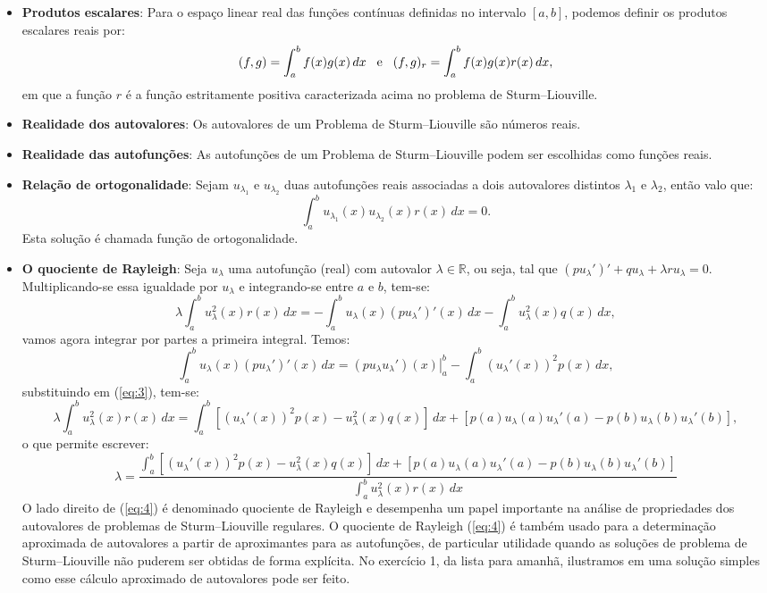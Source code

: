 \documentclass[10pt,a4paper]{article}
\begin{document}
	\begin{itemize}
		\item \textbf{Produtos escalares}: Para o espaço linear real das funções contínuas definidas no intervalo $[a,b]$, podemos definir os produtos escalares reais por: \[(f,g) = \int_a^b f(x)g(x)\,dx \hspace{.3cm}\text{e}\hspace{.3cm}(f,g)_r = \int_a^bf(x)g(x)r(x)\,dx,\] em que a função $r$ é a função estritamente positiva caracterizada acima no problema de Sturm--Liouville.
		\item \textbf{Realidade dos autovalores}: Os autovalores de um Problema de Sturm--Liouville são números reais.
		\item \textbf{Realidade das autofunções}: As autofunções de um Problema de Sturm--Liouville podem ser escolhidas como funções reais.
		\item \textbf{Relação de ortogonalidade}: Sejam $u_{\lambda_1}$ e $u_{\lambda_2}$ duas autofunções reais associadas a dois autovalores distintos $\lambda_1$ e $\lambda_2$, então valo que: \[\int_a^b u_{\lambda_1}(x)u_{\lambda_2}(x)r(x)\,dx = 0.\] Esta solução é chamada função de ortogonalidade.
		\item \textbf{O quociente de Rayleigh}: Seja $u_\lambda$ uma autofunção (real) com autovalor $\lambda\in\mathbb{R}$, ou seja, tal que $(pu_\lambda')'+qu_\lambda+\lambda ru_\lambda = 0$. Multiplicando-se essa igualdade por $u_\lambda$ e integrando-se entre $a$ e $b$, tem-se:
		\begin{equation}
			\lambda\int_a^b u_\lambda^2(x)r(x)\,dx = -\int_a^bu_\lambda(x)(pu_\lambda')'(x)\,dx - \int_a^bu_\lambda^2(x)q(x)\,dx,
			\label{eq:3}
		\end{equation}
		vamos agora integrar por partes a primeira integral. Temos: \[\int_a^bu_\lambda(x)(pu_\lambda')'(x)\,dx = \left. (pu_\lambda u_\lambda')(x) \right|_a^b - \int_a^b(u_\lambda'(x))^2p(x)\,dx,\] substituindo em (\ref{eq:3}), tem-se: \[\lambda\int_a^b u_\lambda^2(x)r(x)\,dx = \int_a^b\left[(u_\lambda'(x))^2p(x)-u_\lambda^2(x)q(x)\right]\,dx + \left[p(a)u_\lambda(a)u_\lambda'(a)-p(b)u_\lambda(b)u_\lambda'(b)\right],\]
		o que permite escrever:
		\begin{equation}
			\lambda = \frac{\int_a^b\left[(u_\lambda'(x))^2p(x)-u_\lambda^2(x)q(x)\right]\,dx + \left[p(a)u_\lambda(a)u_\lambda'(a)-p(b)u_\lambda(b)u_\lambda'(b)\right]}{\int_a^b u_\lambda^2(x)r(x)\,dx}
			\label{eq:4}
		\end{equation}
		O lado direito de (\ref{eq:4}) é denominado quociente de Rayleigh e desempenha um papel importante na análise de propriedades dos autovalores de problemas de Sturm--Liouville regulares. O quociente de Rayleigh (\ref{eq:4}) é também usado para a determinação aproximada de autovalores a partir de aproximantes para as autofunções, de particular utilidade quando as soluções de problema de Sturm--Liouville não puderem ser obtidas de forma explícita. No exercício 1, da lista para amanhã, ilustramos em uma solução simples como esse cálculo aproximado de autovalores pode ser feito.
	\end{itemize}
	
\end{document}
